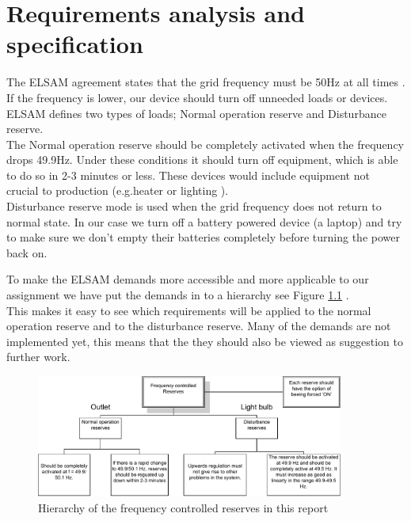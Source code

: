 \chapter[Requirements]{Requirements analysis and specification}
\label{chap:requirements}
The ELSAM agreement states that the grid frequency must be 50Hz at all times . If the frequency is lower, our device should turn off unneeded loads or devices. ELSAM defines two types of loads; Normal operation reserve and Disturbance reserve.\\
The Normal operation reserve should be completely activated when the frequency drops 49.9Hz. Under these conditions it should turn off equipment, which is able to do so in 2-3 minutes or less. These devices would include equipment not crucial to production (e.g.heater or lighting ).\\ 
Disturbance reserve mode is used when the grid frequency does not return to normal state. In our case we turn off a battery powered device (a laptop) and try to make sure we don't empty their batteries completely before turning the power back on.

To make the ELSAM demands more accessible and more applicable to our assignment we have put the demands in to a hierarchy see Figure \ref{fig:reserver_demands} .\\ This makes it easy to see which requirements will be applied to the normal operation reserve and to the disturbance reserve. Many of the demands are not implemented yet, this means that the they should also be viewed as suggestion to further work.

\begin{figure}[!h]
  \centering
  \includegraphics[width=0.9\textwidth]{figs/Demands_for_automatic_active_reserves.pdf}
  \caption{Hierarchy of the frequency controlled reserves in this report}
  \label{fig:reserver_demands}
\end{figure}


